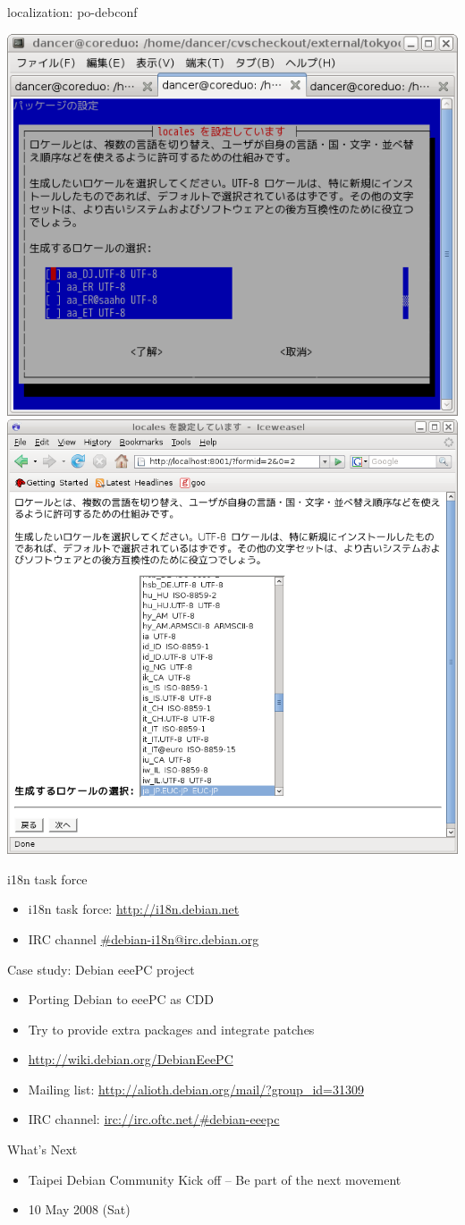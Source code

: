 \documentclass[cjk,dvipdfm,12pt]{beamer}
\begin{document}
\begin{frame}{localization: po-debconf}

 \includegraphics[width=0.5\hsize]{image200805/debconf-text.png}
 \includegraphics[width=0.5\hsize]{image200805/debconf-locales.png}

\end{frame}

\begin{frame}{i18n task force}
 \begin{itemize}
  \item i18n task force: \url{http://i18n.debian.net}
  \item IRC channel \url{\#debian-i18n@irc.debian.org}
 \end{itemize}
\end{frame}

\begin{frame}{Case study: Debian eeePC project}
 \begin{itemize}
  \item Porting Debian to eeePC as CDD
  \item Try to provide extra packages and integrate patches
  \item \url{http://wiki.debian.org/DebianEeePC}
  \item Mailing list: \url{http://alioth.debian.org/mail/?group_id=31309}
  \item IRC channel: \url{irc://irc.oftc.net/\#debian-eeepc}
 \end{itemize}
\end{frame}

\begin{frame}{What's Next}
 \begin{itemize}
  \item Taipei Debian Community Kick off 
	-- Be part of the next movement
  \item 10 May 2008 (Sat)
 \end{itemize}
\end{frame}
\end{document}
